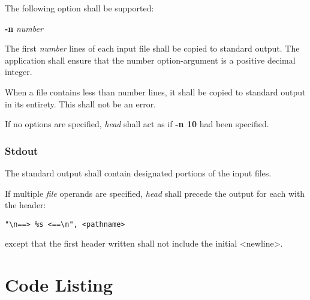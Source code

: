 \documentclass[en, listings]{labreport}
\begin{document}
\noindent
The following option shall be supported:

\textbf{-n} \textit{number}

The first \textit{number} lines of each input file shall be copied to standard output.
The application shall ensure that the number option-argument is a positive decimal integer.

\noindent
When a file contains less than number lines, it shall be copied to standard output
in its entirety. This shall not be an error.

\noindent
If no options are specified, \textit{head} shall act as if \textbf{-n 10} had been specified.

\subsubsection*{Stdout}

\noindent
The standard output shall contain designated portions of the input files.

\noindent
If multiple \textit{file} operands are specified, \textit{head} shall precede
the output for each with the header:

\begin{verbatim}
"\n==> %s <==\n", <pathname>
\end{verbatim}

\noindent
except that the first header written shall not include the initial <newline>.

\section*{Code Listing}

\setmonofont{Fira Mono}

\end{document}
